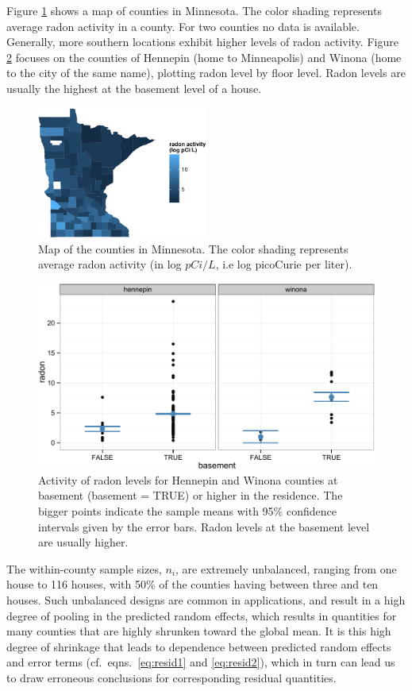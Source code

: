 \documentclass[12pt]{article} %
\begin{document}
Figure \ref{fig:map} shows a map of counties in Minnesota. The color shading represents average radon activity in a county. For two counties no data is available. Generally, more southern locations exhibit higher  levels of radon activity. Figure \ref{fig:tc} focuses on the counties of Hennepin (home to Minneapolis) and Winona (home to the city of the same name), plotting radon level by floor level. Radon levels are usually the highest at the basement level of a house. 
%
\begin{figure}[htb]
\centering
\includegraphics[width=0.5\textwidth]{figures/map.pdf}
\caption{\label{fig:map} Map of the counties in Minnesota. The color shading represents average radon activity (in log $pCi/L$, i.e log picoCurie per liter).}
\end{figure}
%
\begin{figure}[hbt]
\centering
\includegraphics[width=0.7\linewidth]{figures/radon-twocounties.pdf}
\caption{\label{fig:tc} Activity of radon levels for Hennepin and Winona counties at basement (basement = TRUE) or higher in the residence. The bigger points indicate the sample means with 95\% confidence intervals  given by the error bars. Radon levels at the basement level are usually higher.}
\end{figure}
%
The within-county sample sizes, $n_i$, are extremely unbalanced, ranging from one house to 116 houses, with 50\% of the counties having between three and ten houses. Such unbalanced designs are common in applications, and result in a high degree of pooling in the predicted random effects, which results in quantities for many counties that are highly shrunken toward the global mean. It is this high degree of shrinkage that leads to dependence between  predicted random effects and error terms (cf.~eqns.~\ref{eq:resid1} and \ref{eq:resid2}), which in turn can lead us to draw erroneous conclusions for corresponding residual quantities.
\end{document}
